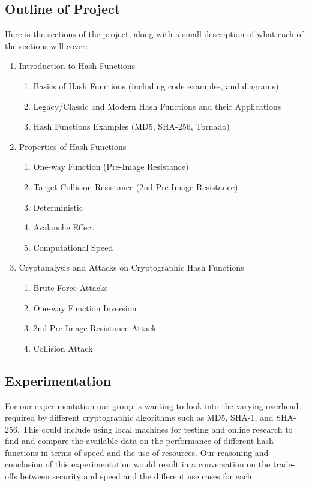 \documentclass[12pt,english]{article}
\begin{document}
\subsection*{Outline of Project}
Here is the sections of the project, along with a small description 
of what each of the sections will cover:
\begin{enumerate}[{\bf (a.)}]
    \item Introduction to Hash Functions
    \begin{enumerate}
        \item Basics of Hash Functions (including code examples, and diagrams)
        \item Legacy/Classic and Modern Hash Functions and their Applications
        \item Hash Functions Examples (MD5, SHA-256, Tornado)
    \end{enumerate} 
    \item Properties of Hash Functions
    \begin{enumerate}
        \item One-way Function (Pre-Image Resistance)
        \item Target Collision Resistance (2nd Pre-Image Resistance)
        \item Deterministic
        \item Avalanche Effect
        \item Computational Speed
    \end{enumerate}
    \item Cryptanalysis and Attacks on Cryptographic Hash Functions
    \begin{enumerate}
        \item Brute-Force Attacks
        \item One-way Function Inversion
        \item 2nd Pre-Image Resistance Attack
        \item Collision Attack
    \end{enumerate}
\end{enumerate}

\subsection*{Experimentation}
For our experimentation our group is wanting to look into 
the varying overhead required by different cryptographic 
algorithms such as MD5, SHA-1, and SHA-256. 
This could include using local machines for testing and online 
research to find and compare the available data on the performance 
of different hash functions in terms of speed and the use of 
resources. Our reasoning and conclusion of this experimentation 
would result in a conversation on the trade-offs between security 
and speed and the different use cases for each.
\end{document}
